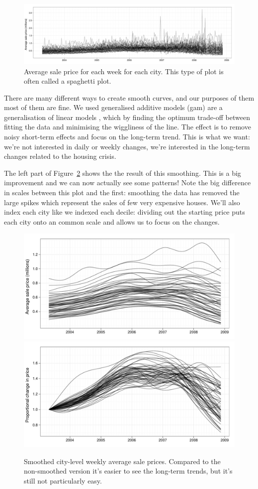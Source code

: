 \documentclass[oneside]{article}
\begin{document}
\begin{figure}[htbp]
  \centering
    \includegraphics[width=0.9\linewidth]{cities-price}
  \caption{Average sale price for each week for each city.  This type of plot is often called a spaghetti plot.}
  \label{fig:spaghetti}
\end{figure}

There are many different ways to create smooth curves, and our purposes of them most of them are fine.  We used generalised additive models ({\sc gam}) are a generalisation of linear models \citep{wood:2006}, which by finding the optimum trade-off between fitting the data and minimising the wiggliness of the line.  The effect is to remove noisy short-term effects and focus on the long-term trend.  This is what we want: we're not interested in daily or weekly changes, we're interested in the long-term changes related to the housing crisis.

The left part of Figure~\ref{fig:smoothed} shows the the result of this smoothing. This is a big improvement and we can now actually see some patterns! Note the big difference in scales between this plot and the first: smoothing the data has removed the large spikes which represent the sales of few very expensive houses. We'll also index each city like we indexed each decile: dividing out the starting price puts each city onto an common scale and allows us to focus on the changes.

\begin{figure}[htbp]
  \centering
  \includegraphics[width=0.5 \linewidth]{cities-smooth}%
  \includegraphics[width=0.5 \linewidth]{cities-indexed}
  \caption{Smoothed city-level weekly average sale prices.  Compared to the non-smoothed version it's easier to see the long-term trends, but it's still not particularly easy.}
  \label{fig:smoothed}
\end{figure}
\end{document}
